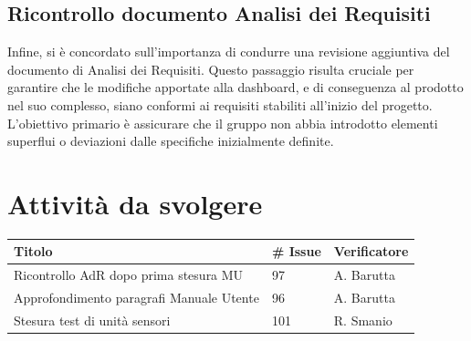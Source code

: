 \documentclass{article}
\begin{document}
    \subsection{Ricontrollo documento Analisi dei Requisiti}
    Infine, si è concordato sull'importanza di condurre una revisione aggiuntiva del documento di Analisi dei Requisiti. Questo passaggio risulta cruciale per garantire che le modifiche apportate alla dashboard, e di conseguenza al prodotto nel suo complesso, siano conformi ai requisiti stabiliti all'inizio del progetto. L'obiettivo primario è assicurare che il gruppo non abbia introdotto elementi superflui o deviazioni dalle specifiche inizialmente definite.

    \section{Attività da svolgere}
    \begin{center}
        \begin{tabular}{|C{7cm}|C{1,5cm}|C{3cm}|}
            \hline
            \textbf{Titolo} & \textbf{\# Issue} & \textbf{Verificatore} \\
            \hline\hline
            Ricontrollo AdR dopo prima stesura MU & 97 & A. Barutta \\
            \hline
            Approfondimento paragrafi Manuale Utente & 96 & A. Barutta \\
            \hline
            Stesura test di unità sensori & 101 & R. Smanio \\
            \hline
        \end{tabular}
    \end{center}
\end{document}
